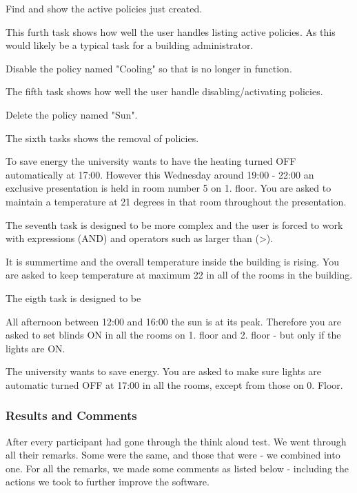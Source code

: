 \begin{framed}
Find and show the active policies just created.
\end{framed}
This furth task shows how well the user handles listing active policies. As this would likely be a typical task for a building administrator.

\begin{framed}
Disable the policy named "Cooling" so that is no longer in function.
\end{framed}
The fifth task shows how well the user handle disabling/activating policies.

\begin{framed}
Delete the policy named "Sun".
\end{framed}
The sixth tasks shows the removal of policies.

\begin{framed}
To save energy the university wants to have the heating turned OFF automatically at 17:00. However this Wednesday around 19:00 - 22:00 an exclusive presentation is held in room number 5 on 1. floor.
You are asked to maintain a temperature at 21 degrees in that room throughout the presentation.
\end{framed}
The seventh task is designed to be more complex and the user is forced to work with expressions (AND) and operators such as larger than (\textgreater).


\begin{framed}
It is summertime and the overall temperature inside the building is rising. You are asked to keep temperature at maximum 22 in all of the rooms in the building.
\end{framed}
The eigth task is designed to be 


\begin{framed}
All afternoon between 12:00 and 16:00 the sun is at its peak. Therefore you are asked to set blinds ON in all the rooms on 1. floor and 2. floor - but only if the lights are ON.
\end{framed}

\begin{framed}
The university wants to save energy. You are asked to make sure lights are automatic turned OFF at 17:00 in all the rooms, except from those on 0. Floor.
\end{framed}



\subsubsection{Results and Comments}
\label{results-and-comments}
After every participant had gone through the think aloud test. We went through all their remarks. Some were the same, and those that were - we combined into one.
For all the remarks, we made some comments as listed below - including the actions we took to further improve the software.


